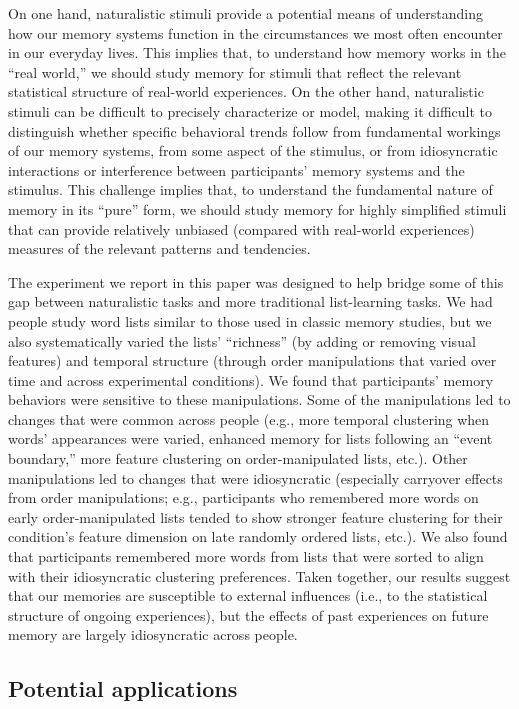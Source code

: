 \documentclass[11pt]{article}
\begin{document}
On one hand, naturalistic stimuli provide a potential means of understanding
how our memory systems function in the circumstances we most often encounter in
our everyday lives. This implies that, to understand how memory works in the
``real world,'' we should study memory for stimuli that reflect the relevant
statistical structure of real-world experiences. On the other hand,
naturalistic stimuli can be difficult to precisely characterize or model,
making it difficult to distinguish whether specific behavioral trends follow
from fundamental workings of our memory systems, from some aspect of the
stimulus, or from idiosyncratic interactions or interference between
participants' memory systems and the stimulus. This challenge implies that, to
understand the fundamental nature of memory in its ``pure'' form, we should
study memory for highly simplified stimuli that can provide relatively unbiased
(compared with real-world experiences) measures of the relevant patterns and
tendencies.

The experiment we report in this paper was designed to help bridge some of this
gap between naturalistic tasks and more traditional list-learning tasks. We had
people study word lists similar to those used in classic memory studies, but we
also systematically varied the lists' ``richness'' (by adding or removing
visual features) and temporal structure (through order manipulations that
varied over time and across experimental conditions). We found that
participants' memory behaviors were sensitive to these manipulations. Some of
the manipulations led to changes that were common across people (e.g., more
temporal clustering when words' appearances were varied, enhanced memory for
lists following an ``event boundary,'' more feature clustering on
order-manipulated lists, etc.). Other manipulations led to changes that were
idiosyncratic (especially carryover effects from order manipulations; e.g.,
participants who remembered more words on early order-manipulated lists tended
to show stronger feature clustering for their condition's feature dimension on
late randomly ordered lists, etc.). We also found that participants remembered
more words from lists that were sorted to align with their idiosyncratic
clustering preferences. Taken together, our results suggest that our memories
are susceptible to external influences (i.e., to the statistical structure of
ongoing experiences), but the effects of past experiences on future memory are
largely idiosyncratic across people.


\subsection*{Potential applications}
\end{document}
